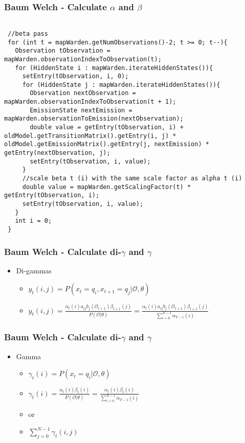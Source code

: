\begin{frame}[fragile]
	\frametitle{Baum Welch - Calculate $\alpha$ and $\beta$}
	\begin{lstlisting}   

 //beta pass
 for (int t = mapWarden.getNumObservations()-2; t >= 0; t--){
   Observation tObservation = mapWarden.observationIndexToObservation(t);
   for (HiddenState i : mapWarden.iterateHiddenStates()){
     setEntry(tObservation, i, 0);
     for (HiddenState j : mapWarden.iterateHiddenStates()){
       Observation nextObservation = mapWarden.observationIndexToObservation(t + 1);
       EmissionState nextEmission = mapWarden.observationToEmission(nextObservation);
       double value = getEntry(tObservation, i) + oldModel.getTransitionMatrix().getEntry(i, j) * oldModel.getEmissionMatrix().getEntry(j, nextEmission) * getEntry(nextObservation, j);
       setEntry(tObservation, i, value);
     }
     //scale beta t (i) with the same scale factor as alpha t (i)
     double value = mapWarden.getScalingFactor(t) * getEntry(tObservation, i);
     setEntry(tObservation, i, value);
   }
   int i = 0;
 }
	\end{lstlisting}
\end{frame}

\begin{frame}
	\frametitle{Baum Welch - Calculate di-$\gamma$ and $\gamma$}
	\begin{itemize}
		\item Di-gammas
		\begin{itemize}
			\item $y_t(i,j) = P(x_t = q_i, x_{t+1} = q_j | \mathcal{O},\theta)$
			\item $y_t(i,j) = \frac{\alpha_t(i) a_{ij} b_j (\mathcal{O}_{t+1})\beta_{t+1}(j)}{P(\mathcal{O} | \theta)} = \frac{\alpha_t(i) a_{ij} b_j (\mathcal{O}_{t+1})\beta_{t+1}(j)}{\sum\limits_{i=0}^{N-1} \alpha_{T-1}(i)}$
		\end{itemize}
	\end{itemize}
\end{frame}

\begin{frame}
	\frametitle{Baum Welch - Calculate di-$\gamma$ and $\gamma$}
	\begin{itemize}
		\item Gamma
		\begin{itemize}
			\item $\gamma_t(i) = P(x_t = q_i|\mathcal{O},\theta)$
			\item $\gamma_t(i) = \frac{\alpha_t(i)\beta_t(i)}{P(\mathcal{O}|\theta)} = \frac{\alpha_t(i)\beta_t(i)}{\sum\limits_{i=0}^{N-1} \alpha_{T-1}(i)}$
			\item or
			\item $ \sum\limits_{j=0}^{N-1} \gamma_t(i,j)$
		\end{itemize}
	\end{itemize}
\end{frame}

